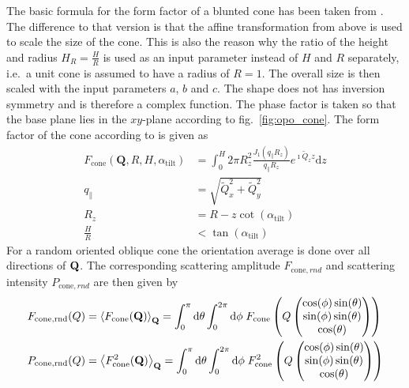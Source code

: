 The basic formula for the form factor of a  blunted cone has been taken from \cite{Renaud2009}. The difference to that version is that the affine transformation from above is used to scale the size of the cone. This is also the reason why the ratio of the height and radius $H_R=\frac{H}{R}$ is used as an input parameter instead of $H$ and $R$ separately, i.e.\ a unit cone is assumed to have a radius of $R=1$. The overall size is then scaled with the input parameters $a$, $b$ and $c$. The shape does not has inversion symmetry and is therefore a complex function. The phase factor is taken so that the base plane lies in the $xy$-plane according to fig.\ \ref{fig:opo_cone}. The form factor of the cone according to \cite{Renaud2009} is given as
\begin{align}\label{eq:opo_cone}
  F_\mathrm{cone}(\mathbf{Q},R,H,\alpha_\mathrm{tilt}) & = \int_0^H2\pi R_z^2 \frac{J_1\left(q_\parallel R_z\right)}{q_\parallel R_z}  e^{\imath \tilde{Q}_z z} \mathrm{d}z\\
  q_\parallel &= \sqrt{\tilde{Q}_x^2+\tilde{Q}_y^2} \\
  R_z &=R-z\cot(\alpha_\mathrm{tilt}) \\
  \frac{H}{R} &< \tan(\alpha_\mathrm{tilt})
\end{align}
For a random oriented oblique cone the orientation average is done over all directions of $\B{Q}$. The corresponding scattering amplitude $F_{\mathrm{cone},rnd}$ and scattering intensity $P_{\mathrm{cone},rnd}$ are then given by
\begin{align}
F_{\mathrm{cone,rnd}}(Q) &= \left\langle F_\mathrm{cone}(\B{Q})\right\rangle_\B{Q} = \int_0^\pi\mathrm{d}\theta \int_0^{2\pi}\mathrm{d}\phi \; F_\mathrm{cone}\left(Q\begin{pmatrix}
                                       \cos(\phi)\sin(\theta) \\
                                       \sin(\phi)\sin(\theta) \\
                                       \cos(\theta)
                                     \end{pmatrix}\right) \\
P_{\mathrm{cone,rnd}}(Q) &= \left\langle F_\mathrm{cone}^2(\B{Q})\right\rangle_\B{Q} = \int_0^\pi\mathrm{d}\theta \int_0^{2\pi}\mathrm{d}\phi \; F_\mathrm{cone}^2\left(Q\begin{pmatrix}
                                       \cos(\phi)\sin(\theta) \\
                                       \sin(\phi)\sin(\theta) \\
                                       \cos(\theta)
                                     \end{pmatrix}\right)
\end{align}

